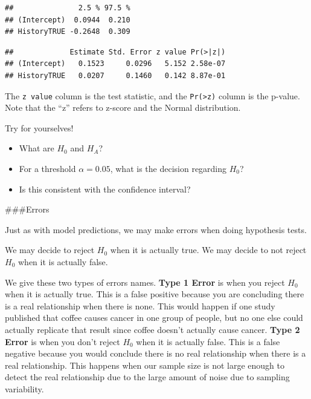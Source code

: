 \documentclass[]{book}
\newenvironment{Shaded}{\begin{snugshade}}{\end{snugshade}}
\newcommand{\KeywordTok}[1]{\textcolor[rgb]{0.13,0.29,0.53}{\textbf{#1}}}
\newcommand{\NormalTok}[1]{#1}
\newcommand{\OperatorTok}[1]{\textcolor[rgb]{0.81,0.36,0.00}{\textbf{#1}}}
\providecommand{\tightlist}{%
  \setlength{\itemsep}{0pt}\setlength{\parskip}{0pt}}
\begin{document}
\begin{verbatim}
##               2.5 % 97.5 %
## (Intercept)  0.0944  0.210
## HistoryTRUE -0.2648  0.309
\end{verbatim}

\begin{Shaded}
\end{Shaded}

\begin{verbatim}
##             Estimate Std. Error z value Pr(>|z|)
## (Intercept)   0.1523     0.0296   5.152 2.58e-07
## HistoryTRUE   0.0207     0.1460   0.142 8.87e-01
\end{verbatim}

The \texttt{z\ value} column is the test statistic, and the \texttt{Pr(\textgreater{}\textbar{}z\textbar{})} column is the p-value. Note that the ``z'' refers to z-score and the Normal distribution.

Try for yourselves!

\begin{itemize}
\tightlist
\item
  What are \(H_0\) and \(H_A\)?
\item
  For a threshold \(\alpha = 0.05\), what is the decision regarding \(H_0\)?
\item
  Is this consistent with the confidence interval?
\end{itemize}

\#\#\#Errors

Just as with model predictions, we may make errors when doing hypothesis tests.

We may decide to reject \(H_0\) when it is actually true. We may decide to not reject \(H_0\) when it is actually false.

We give these two types of errors names. \textbf{Type 1 Error} is when you reject \(H_0\) when it is actually true. This is a false positive because you are concluding there is a real relationship when there is none. This would happen if one study published that coffee causes cancer in one group of people, but no one else could actually replicate that result since coffee doesn't actually cause cancer. \textbf{Type 2 Error} is when you don't reject \(H_0\) when it is actually false. This is a false negative because you would conclude there is no real relationship when there is a real relationship. This happens when our sample size is not large enough to detect the real relationship due to the large amount of noise due to sampling variability.
\end{document}
